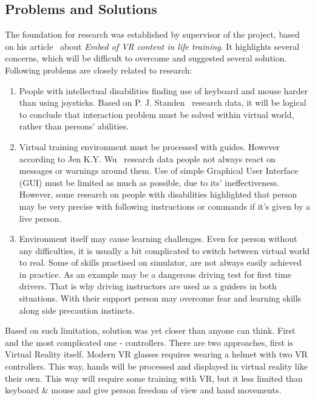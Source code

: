\documentclass[18pt]{article}
\numberwithin{equation}{section} %
\numberwithin{figure}{section} %
\numberwithin{table}{section} %
\begin{document}
	\subsection{Problems and Solutions}
		The foundation for research was established by supervisor of the project, based on his article~\cite{quteprints100187} about \textit{Embed of VR content in life training}. It highlights several concerns, which will be difficult to overcome and suggested several solution. Following problems are closely related to research: \\	
		\begin{enumerate}
			\item People with intellectual disabilities finding use of keyboard and mouse harder than using joysticks. Based on P. J. Standen~\cite{control} research data, it will be logical to conclude that interaction problem must be solved within virtual world, rather than persons' abilities.
			\item Virtual training environment must be processed with guides. However according to Jen K.Y. Wu~\cite{WU20058} research data people not always react on messages or warnings around them. Use of simple Graphical User Interface (GUI) must be limited as much as possible, due to its' ineffectiveness. However, some research on people with disabilities highlighted that person may be very precise with following instructions or commands if it's given by a live person.
			\item Environment itself may cause learning challenges. Even for person without any difficulties, it is usually a bit complicated to switch between virtual world to real. Some of skills practised on simulator, are not always easily achieved in practice. As an example may be a dangerous driving test for first time drivers. That is why driving instructors are used as a guiders in both situations. With their support person may overcome fear and learning skills along side precaution instincts.
		\end{enumerate}
		Based on such limitation, solution was yet closer than anyone can think. First and the most complicated one - controllers. There are two approaches, first is Virtual Reality itself. Modern VR glasses requires wearing a helmet with two VR controllers. This way, hands will be processed and displayed in virtual reality like their own. This way will require some training with VR, but it less limited than keyboard \& mouse and give person freedom of view and hand movements. \\
		
\end{document}
